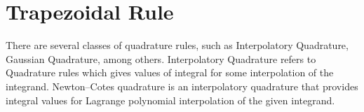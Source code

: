 \documentclass[../document.tex]{subfiles}
\begin{document}
	
	
	
	
	\section{Trapezoidal Rule}
	\nocite{atkinson2008introduction}
	
	There are several classes of quadrature rules, such as  Interpolatory Quadrature, Gaussian Quadrature, among others.
	Interpolatory Quadrature refers to Quadrature rules which gives values of integral for some interpolation of the integrand. Newton–Cotes quadrature is an interpolatory quadrature that provides integral values for Lagrange polynomial interpolation of the given integrand.	
	
\end{document}
